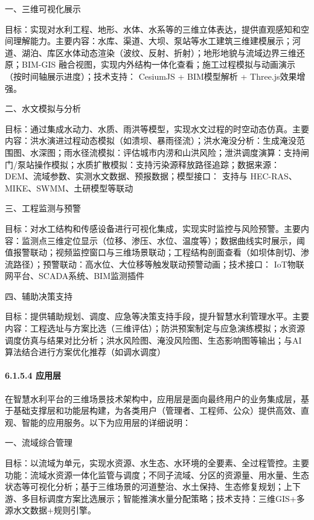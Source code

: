 一、三维可视化展示

目标：实现对水利工程、地形、水体、水系等的三维立体表达，提供直观感知和空间理解能力。主要内容：水库、渠道、大坝、泵站等水工建筑三维建模展示；河道、湖泊、库区水体动态渲染（波纹、反射、折射）；地形地貌与流域边界三维还原；BIM-GIS 融合视图，实现内外结构一体化查看；施工过程模拟与动画演示（按时间轴展示进度）；技术支持： CesiumJS + BIM模型解析 + Three.js效果增强。

二、水文模拟与分析

目标：通过集成水动力、水质、雨洪等模型，实现水文过程的时空动态仿真。主要内容：洪水演进过程动态模拟（如溃坝、暴雨径流）；洪水淹没分析：生成淹没范围图、水深图；雨水径流模拟：评估城市内涝和山洪风险；泄洪调度演算：支持闸门/泵站操作模拟；水质扩散模拟：支持污染源释放路径追踪；数据来源： DEM、流域参数、实测水文数据、预报数据；模型接口： 支持与 HEC-RAS、MIKE、SWMM、土研模型等联动

三、工程监测与预警

目标：对水工结构和传感设备进行可视化集成，实现实时监控与风险预警。主要内容：监测点三维定位显示（位移、渗压、水位、温度等）；数据曲线实时展示，阈值报警联动；视频监控窗口与三维场景联动；工程结构剖面查看（如坝体剖切、渗流路径）；预警联动：高水位、大位移等触发联动预警动画；技术接口： IoT物联网平台、SCADA系统、BIM监测插件

四、辅助决策支持

目标：提供辅助规划、调度、应急等决策支持手段，提升智慧水利管理水平。主要内容：工程选址与方案比选（三维评估）；防洪预案制定与应急演练模拟；水资源调度仿真与结果对比分析；洪水风险图、淹没风险图、生态影响图等输出；与AI算法结合进行方案优化推荐（如调水调度）

\hypertarget{ux5e94ux7528ux5c42}{%
\paragraph{6.1.5.4 应用层}\label{ux5e94ux7528ux5c42}}

在智慧水利平台的三维场景技术架构中，应用层是面向最终用户的业务集成层，基于基础支撑层和功能层构建，为各类用户（管理者、工程师、公众）提供高效、直观、智能的应用服务。以下为应用层的详细说明：

一、流域综合管理

目标：以流域为单元，实现水资源、水生态、水环境的全要素、全过程管控。主要功能：流域水资源一体化监管与调度；不同子流域、分区的资源量、用水量、生态状态等可视化分析；基于三维场景的河道整治、水土保持、生态修复规划；上下游、多目标调度方案比选展示；智能推演水量分配策略；技术支持：三维GIS+多源水文数据+规则引擎。

